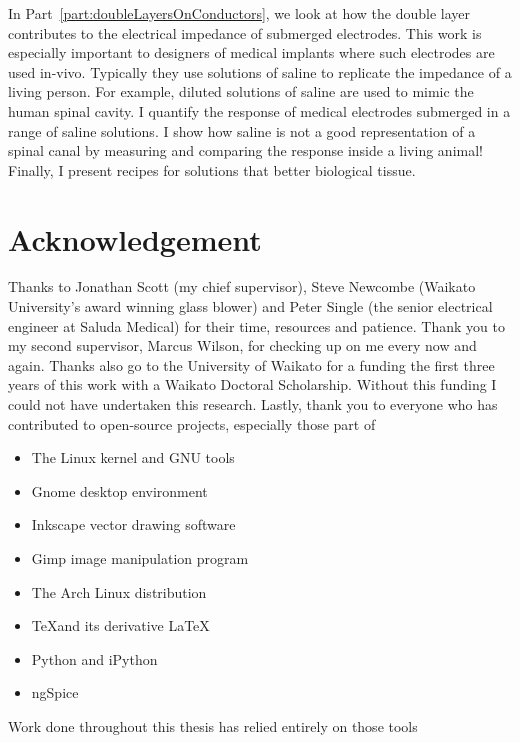   In Part~\ref{part:doubleLayersOnConductors}, we look at how the double layer contributes to the electrical impedance of submerged electrodes.
  This work is especially important to designers of medical implants where such electrodes are used in-vivo.
  Typically they use solutions of saline to replicate the impedance of a living person.
  For example, diluted solutions of saline are used to mimic the human spinal cavity.
  I quantify the response of medical electrodes submerged in a range of saline solutions.
  I show how saline is not a good representation of a spinal canal by measuring and comparing the response inside a living animal!
  Finally, I present recipes for solutions that better biological tissue.


\chapter*{Acknowledgement}
Thanks to Jonathan Scott (my chief supervisor), Steve Newcombe (Waikato University's award winning glass blower) and Peter Single (the senior electrical engineer at Saluda Medical) for their time, resources and patience.
Thank you to my second supervisor, Marcus Wilson, for checking up on me every now and again.
Thanks also go to the University of Waikato for a funding the first three years of this work with a Waikato Doctoral Scholarship.
Without this funding I could not have undertaken this research.
Lastly, thank you to everyone who has contributed to open-source projects, especially those part of
\begin{itemize}
\item The Linux kernel and GNU tools
\item Gnome desktop environment
\item Inkscape vector drawing software
\item Gimp image manipulation program
\item The Arch Linux distribution
\item \TeX \space and its derivative \LaTeX
\item Python and iPython
\item ngSpice
\end{itemize}
Work done throughout this thesis has relied entirely on those tools

\tableofcontents{}
\listoffigures
\listoftables
\doublespacing

